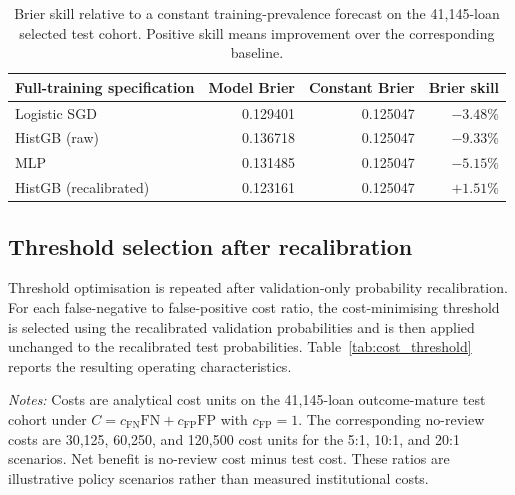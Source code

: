 \documentclass[10pt]{article}
\begin{document}
\begin{table}[!ht]
\centering
\caption{Brier skill relative to a constant training-prevalence forecast on the 41,145-loan selected test cohort. Positive skill means improvement over the corresponding baseline.}
\label{tab:r2_brier_baselines}
\begin{tabular}{lrrr}
\toprule
Full-training specification & Model Brier & Constant Brier & Brier skill \\
\midrule
Logistic SGD & 0.129401 & 0.125047 & $-3.48\%$ \\
HistGB (raw) & 0.136718 & 0.125047 & $-9.33\%$ \\
MLP & 0.131485 & 0.125047 & $-5.15\%$ \\
HistGB (recalibrated) & 0.123161 & 0.125047 & $+1.51\%$ \\
\bottomrule
\end{tabular}
\end{table}

\subsection{Threshold selection after recalibration}
\label{sec:thresholds}

Threshold optimisation is repeated after validation-only probability recalibration. For each false-negative to false-positive cost ratio, the cost-minimising threshold is selected using the recalibrated validation probabilities and is then applied unchanged to the recalibrated test probabilities. Table~\ref{tab:cost_threshold} reports the resulting operating characteristics.

\begin{table}[!ht]
\centering
\caption{Cost-sensitive threshold selection after validation-only recalibration. Thresholds are selected on recalibrated validation probabilities and applied unchanged to the outcome-mature test cohort.}
\label{tab:cost_threshold}

\vspace{3pt}
{\footnotesize \textit{Notes:} Costs are analytical cost units on the 41,145-loan outcome-mature test cohort under $C=c_{\mathrm{FN}}\mathrm{FN}+c_{\mathrm{FP}}\mathrm{FP}$ with $c_{\mathrm{FP}}=1$. The corresponding no-review costs are 30,125, 60,250, and 120,500 cost units for the 5:1, 10:1, and 20:1 scenarios. Net benefit is no-review cost minus test cost. These ratios are illustrative policy scenarios rather than measured institutional costs.}
\end{table}
\end{document}
